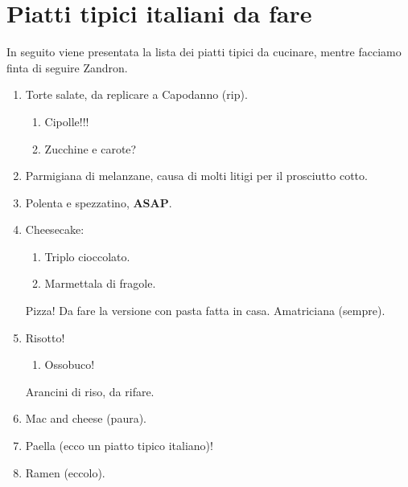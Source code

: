 \section{Piatti tipici italiani da fare}
In seguito viene presentata la lista dei piatti tipici da cucinare, mentre facciamo finta di seguire Zandron.
\begin{enumerate}[label={$\square$}]
	\checkeditem Lasagne, un sacco buone!
	\checkeditem Pasta al forno, buona ma decisamente troppa besciamella (gli shottini sono stati un trauma).
	\item Torte salate, da replicare a Capodanno (rip).
	\begin{enumerate}[label={$\square$}]
			\checkeditem Ricotta e spinaci.
			\checkeditem Bacon e uova.
			\item Cipolle!!!
			\item Zucchine e carote?
		\end{enumerate}
	\item Parmigiana di melanzane, causa di molti litigi per il prosciutto cotto.
	\item Polenta e spezzatino, \textbf{ASAP}.
	\item Cheesecake:
		\begin{enumerate}[label={$\square$}]
			\item Triplo cioccolato.
			\item Marmettala di fragole.
		\end{enumerate}
	\checkeditem Pizza! Da fare la versione con pasta fatta in casa.
	\checkeditem Amatriciana (sempre).
	\item Risotto!
	\begin{enumerate}[label={$\square$}]
		\checkeditem Funghi!
		\item Ossobuco!
	\end{enumerate}
	\checkeditem Arancini di riso, da rifare.
	\item Mac and cheese (paura).
	\item Paella (ecco un piatto tipico italiano)!
	\item Ramen (eccolo).
\end{enumerate}
